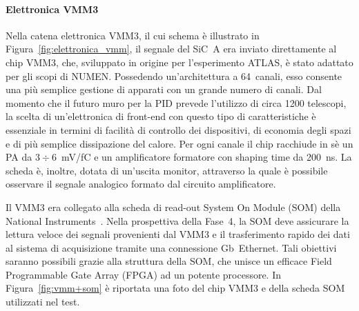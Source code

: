 \paragraph{Elettronica VMM3} 
%
Nella catena elettronica VMM3, il cui schema è illustrato in Figura~\ref{fig:elettronica_vmm}, il segnale del SiC~A era inviato direttamente al chip VMM3, che, sviluppato in origine per l'esperimento ATLAS, è stato adattato per gli scopi di NUMEN.
Possedendo un'architettura a 64~canali, esso consente una più semplice gestione di apparati con un grande numero di canali.
%
%
Dal momento che il futuro muro per la PID prevede l'utilizzo di circa 1200 telescopi, la scelta di un'elettronica di front-end con questo tipo di caratteristiche è essenziale in termini di facilità di controllo dei dispositivi, di economia degli spazi e di più semplice dissipazione del calore.
Per ogni canale il chip racchiude in sè un PA da $3 \div 6$~mV/fC e un amplificatore formatore con shaping time da 200~ns.
La scheda è, inoltre, dotata di un'uscita monitor, attraverso la quale è possibile osservare il segnale analogico formato dal circuito amplificatore.

Il VMM3 era collegato alla scheda di read-out System On Module (SOM) della National Instruments~\cite{national_instruments}.
Nella prospettiva della Fase~4, la SOM deve assicurare la lettura veloce dei segnali provenienti dal VMM3 e il trasferimento rapido dei dati al sistema di acquisizione tramite una connessione Gb~Ethernet.
Tali obiettivi saranno possibili grazie alla struttura della SOM, che unisce un efficace Field Programmable Gate Array (FPGA) ad un potente processore.
In Figura~\ref{fig:vmm+som} è riportata una foto del chip VMM3 e della scheda SOM utilizzati nel test.


